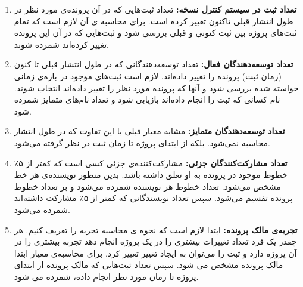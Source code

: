 \begin{enumerate}
	\item
	\textbf{تعداد ثبت در سیستم کنترل نسخه:}
	تعداد ثبت‌هایی که در آن پرونده‌ی ‌مورد نظر در طول انتشار قبلی تاکنون تغییر کرده است. برای محاسبه ی آن لازم است که تمام ثبت‌های پروژه بین ثبت کنونی و  قبلی بررسی شود و ثبت‌هایی که در آن این پرونده تغییر کرده‌اند شمرده شوند.
	\item
	\textbf{تعداد توسعه‌دهندگان 
		فعال:}
	تعداد توسعه‌دهندگانی که در طول انتشار قبلی تا کنون (زمان ثبت) پرونده را تغییر داده‌اند. لازم است ثبت‌های موجود در باز‌ه‌ی زمانی خواسته شده بررسی شود و آنها که پرونده مورد نظر را تغییر داده‌اند انتخاب شوند. نام کسانی که ثبت را انجام داده‌اند بازیابی شود و تعداد نام‌های متمایز شمرده شود. 
	\item
	\textbf{تعداد توسعه‌دهندگان	متمایز:}
	مشابه معیار قبلی با این تفاوت که در طول انتشار محاسبه نمی‌شود. بلکه از ابتدای پروژه تا زمان ثبت در نظر گرفته می‌شود. 
	\item
	\textbf{تعداد مشارکت‌کنندگان جزئی:}
	مشارکت‌کننده‌ی جزئی کسی است که کمتر از ۵٪ خطوط موجود در پرونده به او تعلق داشته باشد. بدین منظور نویسنده‌ی هر خط مشخص می‌شود. تعداد خطوط هر نویسنده شمرده می‌شود و بر تعداد خطوط پرونده تقسیم می‌شود. سپس تعداد نویسندگانی که کمتر از ۵٪ مشارکت داشته‌اند شمرده می‌شود. 
\item
\textbf{تجربه‌ی مالک پرونده:}
	ابتدا لازم است که نحوه ی محاسبه تجربه را تعریف کنیم. هر چقدر یک فرد تعداد تغییرات بیشتری را در یک پروژه انجام دهد تجربه بیشتری را در آن پروژه دارد و ثبت را می‌توان به ایجاد تغییر تعبیر کرد. برای محاسبه‌ی معیار ابتدا مالک پرونده مشخص می شود. سپس تعداد ثبت‌هایی که مالک پرونده از ابتدای پروژه تا زمان مورد نظر انجام داده، شمرده می شود.
\end{enumerate}

